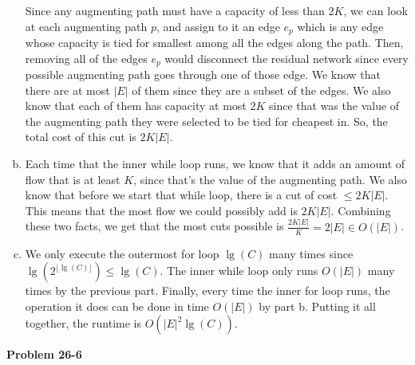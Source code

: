 \documentclass{article}
\begin{document}
\begin{enumerate}[a.]
Since any augmenting path must have a capacity of less than $2K$, we can look at each augmenting path $p$, and assign to it an edge $e_p$ which is any edge whose capacity is tied for smallest among all the edges along the path. Then, removing all of the edges $e_p$ would disconnect the residual network since every possible augmenting path goes through one of those edge. We know that there are at most $|E|$ of them since they are a subset of the edges. We also know that each of them has capacity at most $2K$ since that was the value of the augmenting path they were selected to be tied for cheapest in. So, the total cost of this cut is $2K|E|$.
\item
Each time that the inner while loop runs, we know that it adds an amount of flow that is at least $K$, since that's the value of the augmenting path. We also know that before we start that while loop, there is a cut of cost $\le 2K|E|$. This means that the most flow we could possibly add is $2K|E|$. Combining these two facts, we get that the most cuts possible is $\frac{2K|E|}{K} = 2|E| \in O(|E|)$.
\item
We only execute the outermost for loop $\lg(C)$ many times since $\lg(2^{\lfloor\lg(C)\rfloor}) \le \lg(C)$. The inner while loop only runs $O(|E|)$ many times by the previous part. Finally, every time the inner for loop runs, the operation it does can be done in time $O(|E|)$ by part b. Putting it all together, the runtime is $O(|E|^2 \lg(C))$.
\end{enumerate}

\noindent\textbf{Problem 26-6}\\
\end{document}
